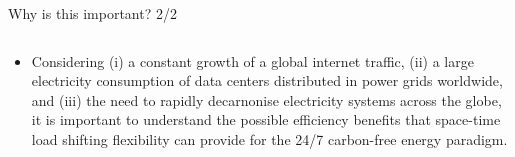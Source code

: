 \begin{frame}{Why is this important? 2/2}
{\begin{columns}[T]
\begin{column}{9cm}
\begin{itemize}
        \item Considering (i) a constant growth of a global internet traffic, (ii) a large electricity consumption of data centers distributed in power grids worldwide, and (iii) the need to rapidly decarnonise electricity systems across the globe, it is \alert{important to understand the possible efficiency benefits that space-time load shifting flexibility can provide for the 24/7 carbon-free energy paradigm}. 

      \end{itemize}
      \end{column}
  

    \end{columns}

  }
\end{frame}



